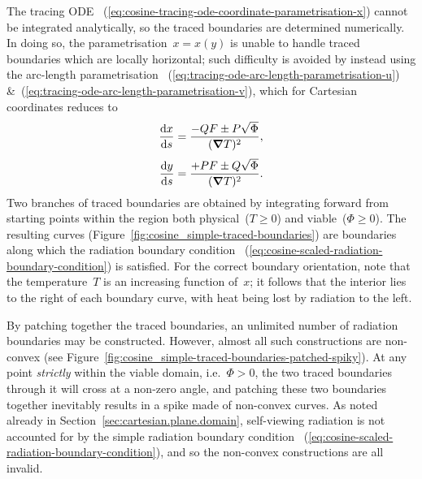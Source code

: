 The tracing ODE~%
  (\ref{eq:cosine-tracing-ode-coordinate-parametrisation-x})
cannot be integrated analytically,
so the traced boundaries are determined numerically.
In doing so, the parametrisation~$x = x (y)$
is unable to handle traced boundaries which are locally horizontal;
such difficulty is avoided by instead using the arc-length parametrisation~%
  (\ref{eq:tracing-ode-arc-length-parametrisation-u})
\&~(\ref{eq:tracing-ode-arc-length-parametrisation-v}),
which for Cartesian coordinates reduces to
\begin{align}
  \tder{x}{s} &= \frac{-Q F \pm P \sqrt{\Phi}}{(\del T)^2},
    \label{eq:cosine-tracing-ode-arc-length-parametrisation-x} \\[\tallspace]
  \tder{y}{s} &= \frac{+P F \pm Q \sqrt{\Phi}}{(\del T)^2}.
    \label{eq:cosine-tracing-ode-arc-length-parametrisation-y}
\end{align}
Two branches of traced boundaries are obtained
by integrating forward
from starting points within the region
both physical~($T \ge 0$) and viable~($\Phi \ge 0$).
The resulting curves (Figure~\ref{fig:cosine_simple-traced-boundaries})
are boundaries along which the radiation boundary condition~%
  (\ref{eq:cosine-scaled-radiation-boundary-condition})
is satisfied.
For the correct boundary orientation,
note that the temperature~$T$ is an increasing function of~$x$;
it follows that the interior lies to the right of each boundary curve,
with heat being lost by radiation to the left.

\begin{figure}
\end{figure}

By patching together the traced boundaries,
an unlimited number of radiation boundaries may be constructed.
However, almost all such constructions are non-convex
(see Figure~\ref{fig:cosine_simple-traced-boundaries-patched-spiky}).
At any point \emph{strictly} within the viable domain,
i.e.~$\Phi > 0$,
the two traced boundaries through it will cross at a non-zero angle,
and patching these two boundaries together
inevitably results in a spike made of non-convex curves.
As noted already in Section~\ref{sec:cartesian.plane.domain},
self-viewing radiation is not accounted for
by the simple radiation boundary condition~%
  (\ref{eq:cosine-scaled-radiation-boundary-condition}),
and so the non-convex constructions are all invalid.

